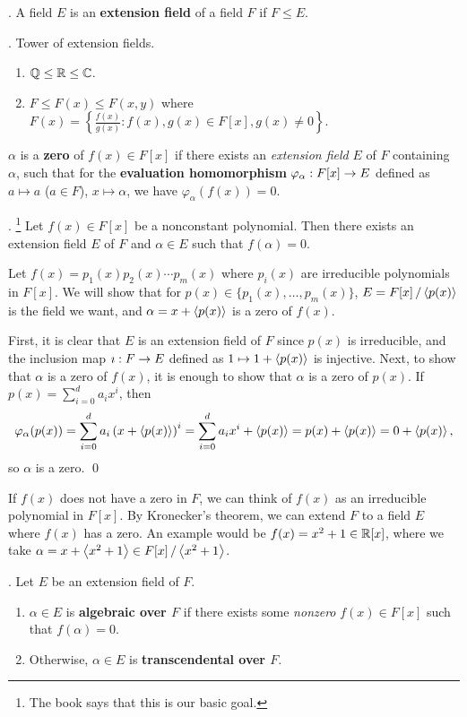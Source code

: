 .  A field \(E\) is an \textbf{extension field} of a field \(F\) if \(F \leq E\).

\ex. Tower of extension fields.
\begin{enumerate}
    \item \(\mathbb{Q} \leq \mathbb{R} \leq \mathbb{C}\).
    \item \(F \leq F(x) \leq F(x, y)\) where \(F(x) = \left\{\frac{f(x)}{g(x)} : f(x), g(x) \in F[x], g(x) \neq 0\right\}\).
\end{enumerate}

\recall \(\alpha\) is a \textbf{zero} of \(f(x) \in F[x]\) if there exists an \textit{extension field} \(E\) of \(F\) containing \(\alpha\), such that for the \textbf{evaluation homomorphism} \(\varphi_\alpha : F[x] \rightarrow E\) defined as \(a \mapsto a\) (\(a \in F\)), \(x \mapsto \alpha\), we have \(\varphi_\alpha(f(x)) = 0\).

\thm.  \footnote{The book says that this is our basic goal.} Let \(f(x) \in F[x]\) be a nonconstant polynomial. Then there exists an extension field \(E\) of \(F\) and \(\alpha \in E\) such that \(f(\alpha) = 0\).

\pf Let \(f(x) = p_1(x)p_2(x)\cdots p_m(x)\) where \(p_i(x)\) are irreducible polynomials in \(F[x]\). We will show that for \(p(x) \in \{p_1(x), \dots, p_m(x)\}\), \(E = F[x] \operatorname{/} \left\langle p(x) \right\rangle\) is the field we want, and \(\alpha = x + \left\langle p(x) \right\rangle\) is a zero of \(f(x)\).

First, it is clear that \(E\) is an extension field of \(F\) since \(p(x)\) is irreducible, and the inclusion map \(\imath : F \rightarrow E\) defined as \(1 \mapsto 1 + \left\langle p(x) \right\rangle\) is injective. Next, to show that \(\alpha\) is a zero of \(f(x)\), it is enough to show that \(\alpha\) is a zero of \(p(x)\). If \(p(x) = \sum_{i=0}^d a_ix^i\), then
\[
    \varphi_\alpha(p(x)) = \sum_{i=0}^d a_i \left( x + \left\langle p(x) \right\rangle \right)^i = \sum_{i=0}^d a_ix^i + \left\langle p(x) \right\rangle = p(x) + \left\langle p(x) \right\rangle = 0 + \left\langle p(x) \right\rangle,
\]
so \(\alpha\) is a zero. \qed

If \(f(x)\) does not have a zero in \(F\), we can think of \(f(x)\) as an irreducible polynomial in \(F[x]\). By Kronecker's theorem, we can extend \(F\) to a field \(E\) where \(f(x)\) has a zero. An example would be \(f(x) = x^2 + 1 \in \mathbb{R}[x]\), where we take \(\alpha = x + \left\langle x^2 + 1 \right\rangle \in F[x] \operatorname{/} \left\langle x^2 + 1 \right\rangle\).

. Let \(E\) be an extension field of \(F\).
\begin{enumerate}
    \item \(\alpha \in E\) is \textbf{algebraic over \(F\)} if there exists some \textit{nonzero} \(f(x) \in F[x]\) such that \(f(\alpha) = 0\).
    \item Otherwise, \(\alpha \in E\) is \textbf{transcendental over \(F\)}.
\end{enumerate}

